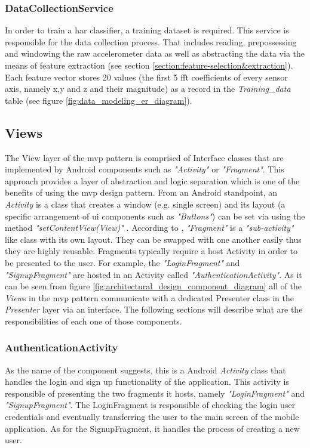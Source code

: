             \subsubsection{DataCollectionService}
            \label{section:data_collection_service}
            In order to train a \gls{har} classifier, a training dataset is required. This service is responsible for the data collection process. That includes reading, prepossessing and windowing the raw accelerometer data as well as abstracting the data via the means of feature extraction (see section \ref{section:feature-selection&extraction}). Each feature vector stores 20 values (the first 5 \gls{fft} coefficients of every sensor axis, namely x,y and z and their magnitude) as a record in the \textit{Training\_data} table (see figure \ref{fig:data_modeling_er_diagram}).
            
        \subsection{Views}
        The View layer of the \gls{mvp} pattern is comprised of Interface classes that are implemented by Android components such as \textit{"Activity"} or \textit{"Fragment"}. This approach provides a layer of abstraction and logic separation which is one of the benefits of using the \gls{mvp} design pattern. From an Android standpoint, an \textit{Activity} is a class that creates a window (e.g. single screen) and its layout (a specific arrangement of \gls{ui} components such as \textit{"Buttons"}) can be set via using the method \textit{"setContentView(View)"} \citep{googleactivity2017}. According to \citet{googlefragments2017}, \textit{"Fragment"} is a \textit{"sub-activity"} like class with its own layout. They can be swapped with one another easily thus they are highly reusable. Fragments typically require a host Activity in order to be presented to the user. For example, the \textit{"LoginFragment"} and \textit{"SignupFragment"} are hosted in an Activity called \textit{"AuthenticationActivity"}. As it can be seen from figure \ref{fig:architectural_design_component_diagram} all of the \textit{View}s in the \gls{mvp} pattern communicate with a dedicated Presenter class in the \textit{Presenter} layer via an interface. The following sections will describe what are the responsibilities of each one of those components.
            
            \subsubsection{AuthenticationActivity}
            As the name of the component suggests, this is a Android \textit{Activity} class that handles the login and sign up functionality of the application. This activity is responsible of presenting the two fragments it hosts, namely \textit{"LoginFragment"} and \textit{"SignupFragment"}. The LoginFragment is responsible of checking the login user credentials and eventually transferring the user to the main screen of the mobile application. As for the SignupFragment, it handles the process of creating a new user.
            
